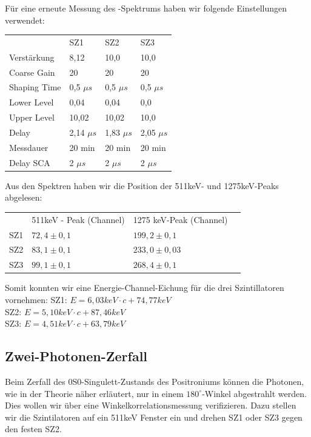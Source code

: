 Für eine erneute Messung des \Na-Spektrums haben wir folgende Einstellungen verwendet:
\begin{center}
\begin{tabular}{llll}
 & SZ1 & SZ2 & SZ3\\
Verstärkung & 8,12 & 10,0 & 10,0\\
Coarse Gain & 20 & 20 & 20\\
Shaping Time & 0,5 $\mu s$ & 0,5 $\mu s$ & 0,5 $\mu s$\\
Lower Level & 0,04 & 0,04 & 0,0\\
Upper Level & 10,02 & 10,02 & 10,0\\
Delay & 2,14 $\mu s$ & 1,83 $\mu s$ & 2,05 $\mu s$\\
Messdauer & 20 min & 20 min & 20 min\\
Delay SCA & 2 $\mu s$ & 2 $\mu s$ & 2 $\mu s$
\end{tabular}
\end{center}

Aus den Spektren haben wir die Position der 511keV- und 1275keV-Peaks abgelesen: %
\begin{center}
\begin{tabular}{llll}
 & 511keV - Peak (Channel) & 1275 keV-Peak (Channel) \\
SZ1 & $72,4 \pm 0,1$ & $199,2 \pm 0,1$ \\
SZ2 & $83,1 \pm 0,1$ & $233,0 \pm 0,03$ \\
SZ3 & $99,1 \pm 0,1$ & $268,4 \pm 0,1$ 
\end{tabular}
\end{center}

Somit konnten wir eine Energie-Channel-Eichung für die drei Szintillatoren vornehmen:
SZ1: $E = 6,03 keV \cdot c + 74,77 keV$\\
SZ2: $E = 5,10 keV \cdot c + 87,46 keV$\\
SZ3: $E = 4,51 keV \cdot c + 63,79 keV$ \\

\subsection{Zwei-Photonen-Zerfall}

Beim Zerfall des 0S0-Singulett-Zustands des Positroniums können die Photonen, wie in der Theorie näher erläutert, nur in einem $180^\circ$-Winkel abgestrahlt werden. Dies wollen wir über eine Winkelkorrelationsmessung verifizieren. Dazu stellen wir die Szintilatoren auf ein 511keV Fenster ein und drehen SZ1 oder SZ3 gegen den festen SZ2. 

